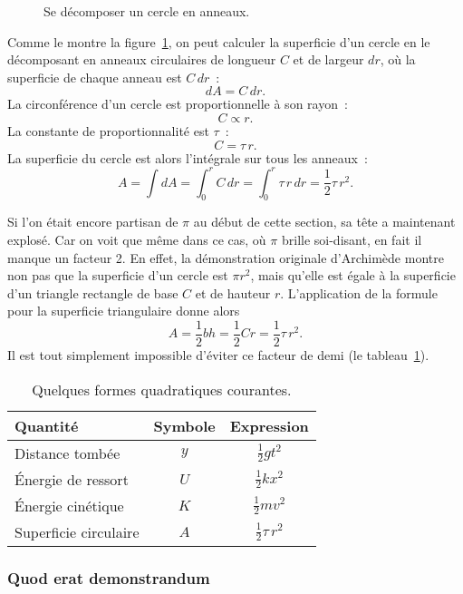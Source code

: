 \begin{figure}
\begin{center}
\end{center}
\caption{Se décomposer un cercle en anneaux.\label{fig:circular_area}}
\end{figure}


Comme le montre la figure~\ref{fig:circular_area}, on peut calculer la superficie d'un cercle en le décomposant en anneaux circulaires de longueur $C$ et de largeur $dr$, où la superficie de chaque anneau est $C\,dr$~:
\[ dA = C\,dr. \]
La circonférence d'un cercle est proportionnelle à son rayon~:
\[ C \propto r. \]
La constante de proportionnalité est $\tau$~:
\[ C = \tau\,r. \]
La superficie du cercle est alors l'intégrale sur tous les anneaux~:
\[ A = \int dA = \int_0^r C\,dr = \int_0^r \tau\,r\,dr = \textstyle{\frac{1}{2}} \tau\,r^2. \]

Si l'on était encore partisan de $\pi$ au début de cette section, sa tête a maintenant explosé. Car on voit que même dans ce cas, où $\pi$ brille soi-disant, en fait il manque un facteur 2. En effet, la démonstration originale d'Archimède montre non pas que la superficie d'un cercle est $\pi r^2$, mais qu'elle est égale à la superficie d'un triangle rectangle de base $C$ et de hauteur $r$. L'application de la formule pour la superficie triangulaire donne alors
\[
  A = \textstyle{\frac{1}{2}} bh = \textstyle{\frac{1}{2}}Cr = \textstyle{\frac{1}{2}}\tau\,r^2.
\]
Il est tout simplement impossible d'éviter ce facteur de demi (le tableau~\ref{table:quadratic_forms}).

\begin{table}
\begin{center}
\begin{tabular}{lcc}
Quantité & Symbole & Expression \\ \hline
Distance tombée & $y$ & $\textstyle{\frac{1}{2}}gt^2$ \smallskip \\
Énergie de ressort & $U$ & $\textstyle{\frac{1}{2}}kx^2$ \smallskip \\
Énergie cinétique & $K$ & $\textstyle{\frac{1}{2}}mv^2$ \smallskip \\
Superficie circulaire & $A$ & $\textstyle{\frac{1}{2}}\tau\,r^2$
\end{tabular}
\end{center}
\caption{Quelques formes quadratiques courantes.\label{table:quadratic_forms}}
\end{table}

    \subsubsection{Quod erat demonstrandum} %
    \label{sec:quod_erat_demonstrandum}

